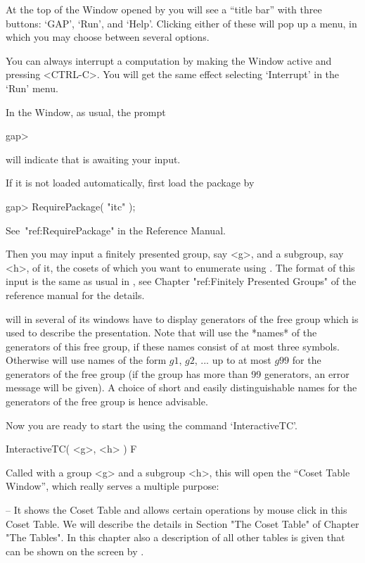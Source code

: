 At the top of the {\GAP} Window opened by {\XGAP} you will see a
``title bar'' with three buttons: `GAP', `Run', and `Help'. Clicking
either of these will pop up a menu, in which you may choose between
several options.

You can always interrupt a computation by making the {\GAP} Window
active and pressing <CTRL-C>. You will get the same effect selecting
`Interrupt' in the `Run' menu.

In the {\GAP} Window, as usual, the {\GAP} prompt

\begintt
gap>
\endtt

will indicate that {\GAP} is awaiting your input.

If it is not loaded automatically, first load the {\ITC} package by

\begintt
gap> RequirePackage( "itc" );
\endtt

See~"ref:RequirePackage" in the {\GAP} Reference Manual.

Then you may input a finitely presented group, say <g>, and a
subgroup, say <h>, of it, the cosets of which you want to enumerate
using {\ITC}. The format of this input is the same as usual in {\GAP},
see Chapter "ref:Finitely Presented Groups" of the {\GAP} reference
manual for the details.

{\ITC} will in several of its windows have to display generators of
the free group which is used to describe the presentation. Note that
{\ITC} will use the *names* of the generators of this free group, if
these names consist of at most three symbols. Otherwise {\ITC} will
use names of the form $g1$, $g2$, ... up to at most $g99$ for the
generators of the free group (if the group has more than 99
generators, an error message will be given). A choice of short and
easily distinguishable names for the generators of the free group is
hence advisable.

Now you are ready to start the {\ITC} using the command `InteractiveTC'.

\>InteractiveTC( <g>, <h> ) F

Called with a group <g> and a subgroup <h>,
this will open the ``Coset Table Window'', which really serves a
multiple purpose:

\beginlist

\item{--}
  It shows the Coset Table and allows certain operations by mouse click
  in this Coset Table. We will describe the details in Section "The
  Coset Table" of Chapter "The Tables". In this chapter also a
  description of all other tables is given that can be shown on the
  screen by {\ITC}.

